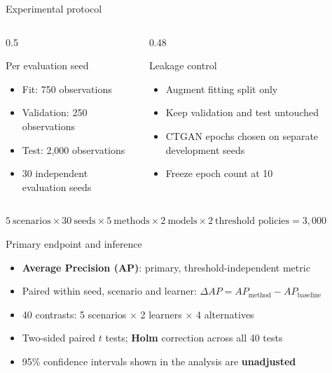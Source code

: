 \documentclass[aspectratio=169,11pt]{beamer}
\begin{document}
	\begin{frame}{Experimental protocol}\begin{columns}[T]\begin{column}{0.5\textwidth}\begin{block}{Per evaluation seed}\begin{itemize}\item Fit: 750 observations\item Validation: 250 observations\item Test: 2,000 observations\item 30 independent evaluation seeds\end{itemize}\end{block}\end{column}\begin{column}{0.48\textwidth}\begin{block}{Leakage control}\begin{itemize}\item Augment fitting split only\item Keep validation and test untouched\item CTGAN epochs chosen on separate development seeds\item Freeze epoch count at 10\end{itemize}\end{block}\end{column}\end{columns}\vspace{0.8em}\centering\large $5\ \text{scenarios}\times 30\ \text{seeds}\times 5\ \text{methods}\times 2\ \text{models}\times 2\ \text{threshold policies}=3{,}000$\end{frame}
	\begin{frame}{Primary endpoint and inference}\begin{itemize}\setlength\itemsep{0.7em}\item \textbf{Average Precision (AP)}: primary, threshold-independent metric\item Paired within seed, scenario and learner: $\Delta AP=AP_{\mathrm{method}}-AP_{\mathrm{baseline}}$\item 40 contrasts: 5 scenarios $\times$ 2 learners $\times$ 4 alternatives\item Two-sided paired $t$ tests; \textbf{Holm} correction across all 40 tests\item 95\% confidence intervals shown in the analysis are \textbf{unadjusted}\end{itemize}\end{frame}
\end{document}

